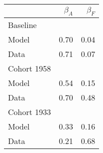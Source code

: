 \begin{tabular}{lrr}
\hline
  & $\beta_{A}$  & $\beta_{F}$  \\ 
\hline
Baseline &   &   \\ 
Model & 0.70  & 0.04  \\ 
Data & 0.71  & 0.07  \\ 
Cohort 1958 &   &   \\ 
Model & 0.54  & 0.15  \\ 
Data & 0.70  & 0.48  \\ 
Cohort 1933 &   &   \\ 
Model & 0.33  & 0.16  \\ 
Data & 0.21  & 0.68  \\ 
\hline
\end{tabular}%
